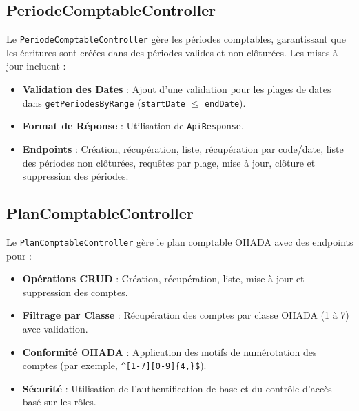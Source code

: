 \documentclass[a4paper,12pt]{article}
\begin{document}
\subsection{PeriodeComptableController}
Le \texttt{PeriodeComptableController} gère les périodes comptables, garantissant que les écritures sont créées dans des périodes valides et non clôturées. Les mises à jour incluent :
\begin{itemize}
    \item \textbf{Validation des Dates} : Ajout d'une validation pour les plages de dates dans \texttt{getPeriodesByRange} (\texttt{startDate} $\leq$ \texttt{endDate}).
    \item \textbf{Format de Réponse} : Utilisation de \texttt{ApiResponse}.
    \item \textbf{Endpoints} : Création, récupération, liste, récupération par code/date, liste des périodes non clôturées, requêtes par plage, mise à jour, clôture et suppression des périodes.
\end{itemize}

\subsection{PlanComptableController}
Le \texttt{PlanComptableController} gère le plan comptable OHADA avec des endpoints pour :
\begin{itemize}
    \item \textbf{Opérations CRUD} : Création, récupération, liste, mise à jour et suppression des comptes.
    \item \textbf{Filtrage par Classe} : Récupération des comptes par classe OHADA (1 à 7) avec validation.
    \item \textbf{Conformité OHADA} : Application des motifs de numérotation des comptes (par exemple, \texttt{^[1-7][0-9]\{4,\}\$}).
    \item \textbf{Sécurité} : Utilisation de l'authentification de base et du contrôle d'accès basé sur les rôles.
\end{itemize}
\end{document}
